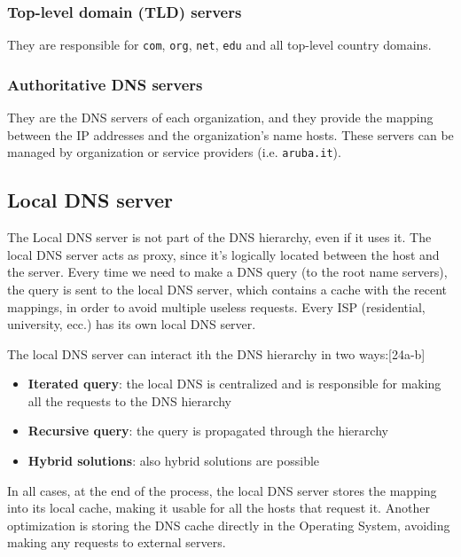 \subsubsection{Top-level domain (TLD) servers}
They are responsible for \texttt{com}, \texttt{org}, \texttt{net}, \texttt{edu} and all top-level country domains.

\subsubsection{Authoritative DNS servers}
They are the DNS servers of each organization, and they provide the mapping between the IP addresses and the organization's name hosts. These servers can be managed by organization or service providers (i.e. \texttt{aruba.it}).

\subsection{Local DNS server}
The Local DNS server is not part of the DNS hierarchy, even if it uses it. The local DNS server acts as proxy, since it's logically located between the host and the server. Every time we need to make a DNS query (to the root name servers), the query is sent to the local DNS server, which contains a cache with the recent mappings, in order to avoid multiple useless requests. Every ISP (residential, university, ecc.) has its own local DNS server.

The local DNS server can interact ith the DNS hierarchy in two ways:[24a-b]
\begin{itemize}
    \item \textbf{Iterated query}: the local DNS is centralized and is responsible for making all the requests to the DNS hierarchy
    \item \textbf{Recursive query}: the query is propagated through the hierarchy
    \item \textbf{Hybrid solutions}: also hybrid solutions are possible
\end{itemize}

\noindent In all cases, at the end of the process, the local DNS server stores the mapping into its local cache, making it usable for all the hosts that request it. Another optimization is storing the DNS cache directly in the Operating System, avoiding making any requests to external servers.


